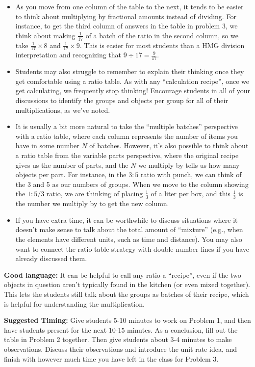 \documentclass[nooutcomes,noauthor,handout]{ximera}
\begin{document}
\begin{instructorNotes}
\begin{itemize}
	\item As you move from one column of the table to the next, it tends to be easier to think about multiplying by fractional amounts instead of dividing. For instance, to get the third column of answers in the table in problem 3, we think about making $\frac{1}{17}$ of a batch of the ratio in the second column, so we take $\frac{1}{17} \times 8$ and $\frac{1}{17} \times 9$. This is easier for most students than a HMG division interpretation and recognizing that $9 \div 17 = \frac{9}{17}$.
	\item Students may also struggle to remember to explain their thinking once they get comfortable using a ratio table. As with any ``calculation recipe'', once we get calculating, we frequently stop thinking! Encourage students in all of your discussions to identify the groups and objects per group for all of their multiplications, as we've noted.
	\item It is usually a bit more natural to take the ``multiple batches'' perspective with a ratio table, where each column represents the number of items you have in some number $N$ of batches. However, it's also possible to think about a ratio table from the variable parts perspective, where the original recipe gives us the number of parts, and the $N$ we multiply by tells us how many objects per part. For instance, in the $3:5$ ratio with punch, we can think of the 3 and 5 as our numbers of groups. When we move to the column showing the $1: 5/3$ ratio, we are thinking of placing $\frac13$ of a liter per box, and this $\frac13$ is the number we multiply by to get the new column. 
     \item  If you have extra time, it can be worthwhile to discuss situations where it doesn't make sense to talk about the total amount of ``mixture'' (e.g., when the elements have different units, such as time and distance). You may also want to connect the ratio table strategy with double number lines if you have already discussed them.

\end{itemize}

{\bf Good language:} It can be helpful to call any ratio a ``recipe'', even if the two objects in question aren't typically found in the kitchen (or even mixed together). This lets the students still talk about the groups as batches of their recipe, which is helpful for understanding the multiplication.

{\bf Suggested Timing:}  Give students 5-10 minutes to work on Problem 1, and then have students present for the next 10-15 minutes. As a conclusion, fill out the table in Problem 2 together. Then give students about 3-4 minutes to make observations. Discuss their observations and introduce the unit rate idea, and finish with however much time you have left in the class for Problem 3.

\end{instructorNotes}
\end{document}
